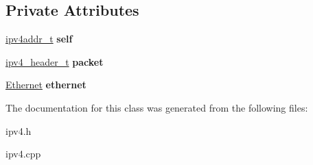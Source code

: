 \subsection*{Private Attributes}
\begin{DoxyCompactItemize}
\item 
\mbox{\label{classIPv4_a4288e410994ae3a739dc7e2a6aedeb90}} 
\hyperlink{unionipv4addr__t}{ipv4addr\+\_\+t} {\bfseries self}
\item 
\mbox{\label{classIPv4_abc94da213c7f9b909a96821315230fbc}} 
\hyperlink{structipv4__header__t}{ipv4\+\_\+header\+\_\+t} {\bfseries packet}
\item 
\mbox{\label{classIPv4_a0cded8cd68cb45095673e91d3739a15c}} 
\hyperlink{classEthernet}{Ethernet} {\bfseries ethernet}
\end{DoxyCompactItemize}


The documentation for this class was generated from the following files\+:\begin{DoxyCompactItemize}
\item 
ipv4.\+h\item 
ipv4.\+cpp\end{DoxyCompactItemize}
